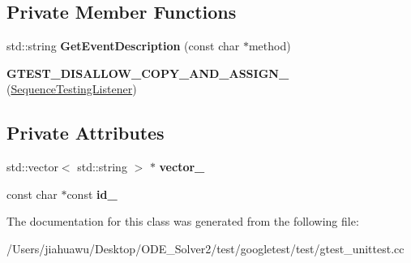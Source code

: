 \subsection*{Private Member Functions}
\begin{DoxyCompactItemize}
\item 
\mbox{\label{class_sequence_testing_listener_adc3ddea0d1af961470237ed96433e945}} 
std\+::string {\bfseries Get\+Event\+Description} (const char $\ast$method)
\item 
\mbox{\label{class_sequence_testing_listener_a56de089e40314ad71db2ec3a56a87699}} 
{\bfseries G\+T\+E\+S\+T\+\_\+\+D\+I\+S\+A\+L\+L\+O\+W\+\_\+\+C\+O\+P\+Y\+\_\+\+A\+N\+D\+\_\+\+A\+S\+S\+I\+G\+N\+\_\+} (\mbox{\hyperlink{class_sequence_testing_listener}{Sequence\+Testing\+Listener}})
\end{DoxyCompactItemize}
\subsection*{Private Attributes}
\begin{DoxyCompactItemize}
\item 
\mbox{\label{class_sequence_testing_listener_a93b46c1c1e2eccdc09fda4fe96fa5998}} 
std\+::vector$<$ std\+::string $>$ $\ast$ {\bfseries vector\+\_\+}
\item 
\mbox{\label{class_sequence_testing_listener_af5abf1f122fac090d4bdf9de0735da96}} 
const char $\ast$const {\bfseries id\+\_\+}
\end{DoxyCompactItemize}


The documentation for this class was generated from the following file\+:\begin{DoxyCompactItemize}
\item 
/\+Users/jiahuawu/\+Desktop/\+O\+D\+E\+\_\+\+Solver2/test/googletest/test/gtest\+\_\+unittest.\+cc\end{DoxyCompactItemize}
